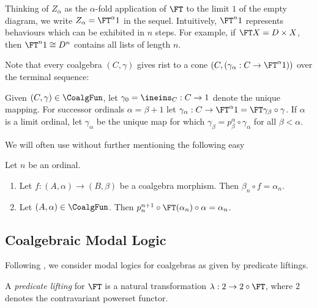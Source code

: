 \documentclass{entcs}
\begin{document}
Thinking of $Z_{\alpha}$ as the $\alpha$-fold application of $\FT$ to
the limit $1$ of the empty diagram, we write $Z_{\alpha} =
\FT^{\alpha} 1$ in the sequel.  Intuitively, $\FT^n 1$ represents
behaviours which can be exhibited in $n$ steps.  For example, if $\FT X
= D \times X$, then $\FT^n 1 \cong D^n$ contains all lists of length
$n$.

Note that every coalgebra $(C, \gamma)$ gives rist to a cone $(C,
(\gamma_{\alpha}: C \to \FT^{\alpha} 1))$ over the terminal
sequence:

\begin{defn}\label{def:n-step-beh}
  Given $(C, \gamma) \in \CoalgFun$, let $\gamma_0 = \ineins_C: C \to 1$
  denote the unique mapping. For successor ordinals $\alpha = \beta +
  1$ let $\gamma_{\alpha}: C \to \FT^{\alpha}1 = \FT\gamma_{\beta}
  \circ \gamma$.  If $\alpha$ is a limit ordinal, let
  $\gamma_{\alpha}$ be the unique map for which $\gamma_{\beta} =
  p^{\alpha}_{\beta} \circ \gamma_{\alpha}$ for all $\beta < \alpha$.
\end{defn}
We will often use without further mentioning the following easy
\begin{prop}\label{prop:easy} Let $n$ be an ordinal.
\begin{enumerate}
\item Let $f:(A,\alpha)\to(B,\beta)$ be a coalgebra morphism. Then
  $\beta_n\circ f=\alpha_n$.
\item Let $(A,\alpha)\in\CoalgFun$. Then
  $p^{n+1}_n\circ\FT(\alpha_n)\circ\alpha=\alpha_n$.
\end{enumerate}
\end{prop}


\subsection{Coalgebraic Modal Logic}

Following \cite{pattinson:sem-mod,pattinson:cml-report},
we consider modal logics for coalgebras as given by predicate liftings.

\begin{defn}
A \emph{predicate lifting} for $\FT$ is a natural transformation $\lambda: 2 \to
2 \circ \FT$, where $2$ denotes the contravariant powerset functor.
\end{defn}
\end{document}
